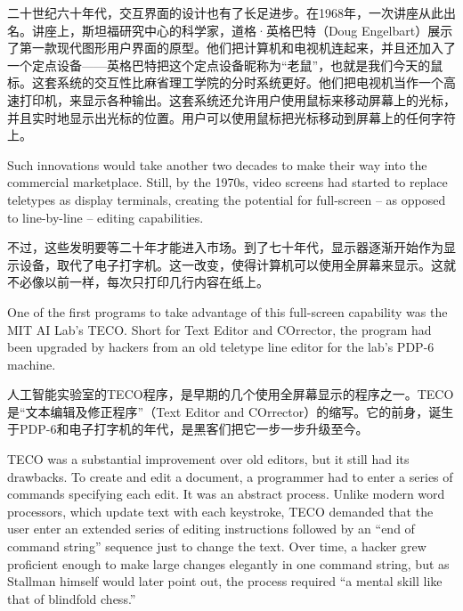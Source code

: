 \ifdefined\chs
二十世纪六十年代，交互界面的设计也有了长足进步。在1968年，一次讲座从此出名。讲座上，斯坦福研究中心的科学家，道格·英格巴特（Doug Engelbart）展示了第一款现代图形用户界面的原型。他们把计算机和电视机连起来，并且还加入了一个定点设备——英格巴特把这个定点设备昵称为“老鼠”，也就是我们今天的鼠标。这套系统的交互性比麻省理工学院的分时系统更好。他们把电视机当作一个高速打印机，来显示各种输出。这套系统还允许用户使用鼠标来移动屏幕上的光标，并且实时地显示出光标的位置。用户可以使用鼠标把光标移动到屏幕上的任何字符上。
\fi

\ifdefined\eng
Such innovations would take another two decades to make their way into the commercial marketplace. Still, by the 1970s, video screens had started to replace teletypes as display terminals, creating the potential for full-screen -- as opposed to line-by-line -- editing capabilities.
\fi

\ifdefined\chs
不过，这些发明要等二十年才能进入市场。到了七十年代，显示器逐渐开始作为显示设备，取代了电子打字机。这一改变，使得计算机可以使用全屏幕来显示。这就不必像以前一样，每次只打印几行内容在纸上。
\fi

\ifdefined\eng
One of the first programs to take advantage of this full-screen capability was the MIT AI Lab's TECO. Short for Text Editor and COrrector, the program had been upgraded by hackers from an old teletype line editor for the lab's PDP-6 machine.
\fi

\ifdefined\chs
人工智能实验室的TECO程序，是早期的几个使用全屏幕显示的程序之一。TECO是“文本编辑及修正程序”（Text Editor and COrrector）的缩写。它的前身，诞生于PDP-6和电子打字机的年代，是黑客们把它一步一步升级至今。
\fi

\ifdefined\eng
TECO was a substantial improvement over old editors, but it still had its drawbacks. To create and edit a document, a programmer had to enter a series of commands specifying each edit. It was an abstract process. Unlike modern word processors, which update text with each keystroke, TECO demanded that the user enter an extended series of editing instructions followed by an ``end of command string'' sequence just to change the text. Over time, a hacker grew proficient enough to make large changes elegantly in one command string, but as Stallman himself would later point out, the process required ``a mental skill like that of blindfold chess.''
\fi

